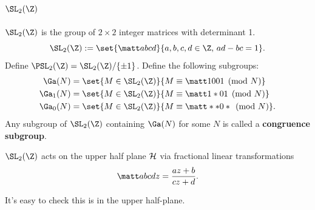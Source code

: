 \subsection{$\SL_2(\Z)$}
\begin{df}
$\SL_2(\Z)$ is the group of $2\times 2$ integer matrices with determinant 1.
\[
\SL_2(\Z):=\set{\matt abcd}{a,b,c,d\in \Z, \, ad-bc=1}.
\]
Define $\PSL_2(\Z)=\SL_2(\Z)/\{\pm 1\}$.
Define the following subgroups:
\begin{align*}
\Ga(N)&=\set{M\in \SL_2(\Z)}{M\equiv \matt 1001\pmod{N}}\\
\Ga_1(N)&=\set{M\in \SL_2(\Z)}{M\equiv \matt 1*01\pmod{N}}\\
\Ga_0(N)&=\set{M\in \SL_2(\Z)}{M\equiv \matt **0* \pmod{N}}.
\end{align*}
Any subgroup of $\SL_2(\Z)$ containing $\Ga(N)$ for some $N$ is called a \textbf{congruence subgroup}.
\end{df}
\begin{df}
$\SL_2(\Z)$ acts on the upper half plane $\cal H$ via fractional linear transformations
\[
\matt abcd z=\frac{az+b}{cz+d}.%
\]
\end{df}
It's easy to check this is in the upper half-plane.

